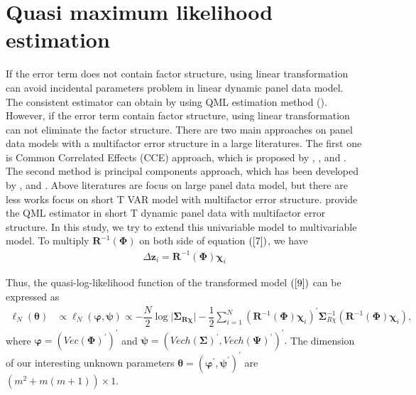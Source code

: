 \documentclass[12pt,a4paper,hyperref]{article}
\begin{document}
\section{Quasi maximum likelihood estimation}
If the error term does not contain factor structure, using linear transformation can avoid incidental parameters problem in linear dynamic panel data model. The consistent estimator can obtain by using QML estimation method (\citet{Hsiao:2002}). However, if the error term contain factor structure, using linear transformation can not eliminate the factor structure.
There are two main approaches on panel data models with a multifactor error structure in a large literatures. The first one is  Common Correlated Effects (CCE) approach, which is proposed by \citet{Pesaran:2006}, \citet{Kapetanios:2011}, \citet{Chudik:2011} and \citet{Chudik:2015}. The second method is principal components approach, which has been developed by \citet{Bai:2002}, \citet{Bai:2009} and \citet{Moon:2015}.
Above literatures are focus on large panel data model, but there are less works focus on short T VAR model with multifactor error structure.
\cite{Hayakawa:2018} provide the QML estimator in short T dynamic panel data with multifactor error structure.  In this study, we try to extend this univariable model to multivariable model.
To multiply $\boldsymbol{R}^{-1}(\boldsymbol{\Phi})$ on both side of equation $\left(\ref{7} \right)$, we have
\begin{align}
\Delta \boldsymbol{z}_{i}=\boldsymbol{R} ^{-1}(\boldsymbol{\Phi})\boldsymbol{\chi}_{i} \label{9}
\end{align}


Thus, the quasi-log-likelihood function of the transformed model $(\ref{9})$ can be expressed as
\begin{align}
\ell_{N}\left(\boldsymbol{\theta}\right)&\propto \ell_{N}\left(  \boldsymbol{\varphi}, \boldsymbol{\psi} \right)\propto-\dfrac{N}{2}\log\vert  \boldsymbol{\Sigma_{R \chi}}\vert-\dfrac{1}{2}\sum^{N}_{i=1}\left( \boldsymbol{R}^{-1}(\boldsymbol{\Phi})\boldsymbol{\chi}_{i}\right)^{'}\boldsymbol{\Sigma}_{R \chi}^{-1}\left( \boldsymbol{R}^{-1}(\boldsymbol{\Phi}) \boldsymbol{\chi}_{i}\right), \label{10}
\end{align}
where  $\boldsymbol{\varphi}=\left(Vec(\boldsymbol{\Phi})^{'}\right)^{'}$ and $ \boldsymbol{\psi}=\left(Vech(\boldsymbol{\Sigma})^{'}, Vech(\boldsymbol{\Psi})^{'} \right)^{'}.$ The dimension of our interesting unknown parameters $\boldsymbol{\theta}=\left(\boldsymbol{\varphi}^{'}, \boldsymbol{\psi}^{'} \right)^{'}$ are $\left( m^{2}+m(m+1) \right) \times 1$.
\end{document}
